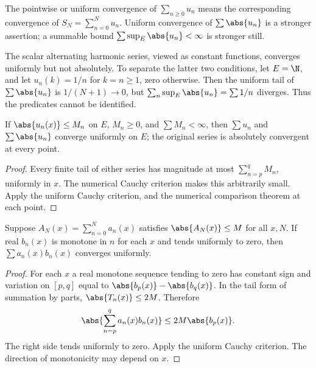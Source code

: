 \begin{definition}
The pointwise or uniform convergence of $\sum_{n\geq0}u_n$ means the corresponding convergence of $S_N=\sum_{n=0}^Nu_n$. Uniform convergence of $\sum\abs{u_n}$ is a stronger assertion; a summable bound $\sum\sup_E\abs{u_n}<\infty$ is stronger still.
\end{definition}
\begin{example}
The scalar alternating harmonic series, viewed as constant functions, converges uniformly but not absolutely. To separate the latter two conditions, let $E=\N$, and let $u_n(k)=1/n$ for $k=n\geq1$, zero otherwise. Then the uniform tail of $\sum\abs{u_n}$ is $1/(N+1)\to0$, but $\sum_n\sup_E\abs{u_n}=\sum1/n$ diverges. Thus the predicates cannot be identified.
\end{example}

\begin{theorem}
If $\abs{u_n(x)}\leq M_n$ on $E$, $M_n\geq0$, and $\sum M_n<\infty$, then $\sum u_n$ and $\sum\abs{u_n}$ converge uniformly on $E$; the original series is absolutely convergent at every point.
\end{theorem}
\begin{proof}
Every finite tail of either series has magnitude at most $\sum_{n=p}^qM_n$, uniformly in $x$. The numerical Cauchy criterion makes this arbitrarily small. Apply the uniform Cauchy criterion, and the numerical comparison theorem at each point.
\end{proof}

\begin{theorem}
Suppose $A_N(x)=\sum_{n=0}^Na_n(x)$ satisfies $\abs{A_N(x)}\leq M$ for all $x,N$. If real $b_n(x)$ is monotone in $n$ for each $x$ and tends uniformly to zero, then $\sum a_n(x)b_n(x)$ converges uniformly.
\end{theorem}
\begin{proof}
For each $x$ a real monotone sequence tending to zero has constant sign and variation on $[p,q]$ equal to $\abs{b_p(x)}-\abs{b_q(x)}$. In the tail form of summation by parts, $\abs{T_n(x)}\leq2M$. Therefore
\[\abs{\sum_{n=p}^q a_n(x)b_n(x)}\leq2M\abs{b_p(x)}.\]
The right side tends uniformly to zero. Apply the uniform Cauchy criterion. The direction of monotonicity may depend on $x$.
\end{proof}

